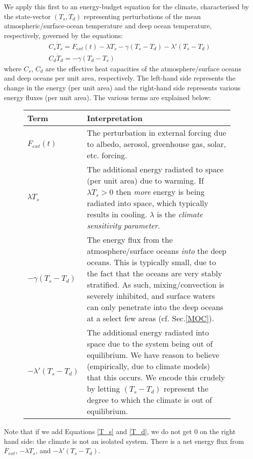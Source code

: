 We apply this first to an energy-budget equation for the climate, characterised by the state-vector $(T_s,T_d)$ representing perturbations of the mean atmospheric/surface-ocean temperature and deep ocean temperature, respectively, governed by the equations:
\begin{align}
    \label{T_s}
    &\boxed{C_s \dot{T}_s = F_{ext}(t)-\lambda T_s -\gamma (T_s-T_d) - \lambda'(T_s-T_d)}
    \\ 
    \label{T_d}
    &\boxed{C_d \dot{T}_d = -\gamma (T_d-T_s)}
\end{align}
where $C_s$, $C_d$ are the effective heat capacities of the atmosphere/surface oceans and deep oceans per unit area, respectively. The left-hand side represents the change in the energy (per unit area) and the right-hand side represents various energy fluxes (per unit area). The various terms are explained below:
\begin{figure}[H]
\begin{tabular}{|p{2.8cm}|p{13.4cm}|}
\hline
    Term & Interpretation \\
\hline
\hline
$F_{ext}(t)$ & The perturbation in external forcing due to albedo, aerosol, greenhouse gas, solar, etc. forcing.\\
\hline
$\lambda T_s$ & The additional energy radiated to space (per unit area) due to warming. If $\lambda T_s>0$ then \textit{more} energy is being radiated into space, which typically results in cooling. $\lambda$ is the \textit{climate sensitivity parameter}. \\ 
\hline
$-\gamma (T_s-T_d)$ & The energy flux from the atmosphere/surface oceans \textit{into} the deep oceans. This is typically small, due to the fact that the oceans are very stably stratified. As such, mixing/convection is severely inhibited, and surface waters can only penetrate into the deep oceans at a select few areas (cf. Sec.\ref{MOC}).\\
\hline
$- \lambda'(T_s-T_d)$ & The additional energy radiated into space due to the system being out of equilibrium. We have reason to believe (empirically, due to climate models) that this occurs. We encode this crudely by letting $(T_s-T_d)$ represent the degree to which the climate is out of equilibrium.\\
\hline
\end{tabular}
\end{figure}
Note that if we add Equations \ref{T_s} and \ref{T_d}, we do not get $0$ on the right hand side: the climate is not an isolated system. There is a net energy flux from $F_{ext}$, $-\lambda T_s$, and $-\lambda ' (T_s-T_d)$.

